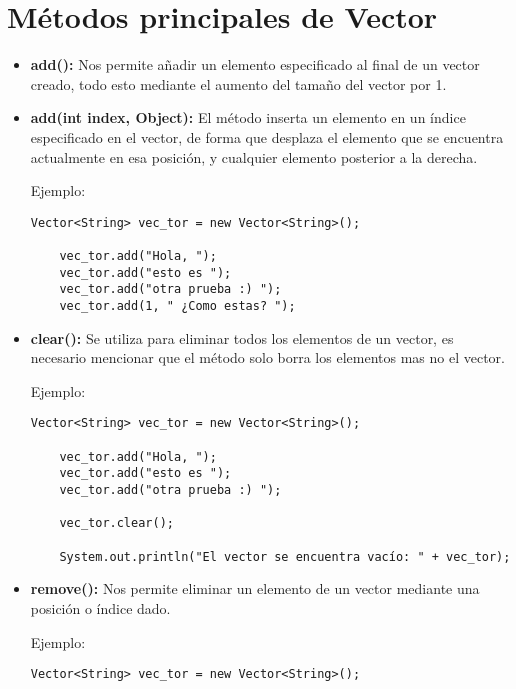 \documentclass[12pt, letterpaper]{article} %
\begin{document}
\section*{Métodos principales de Vector}
\begin{itemize}
    \item \textbf{add():} Nos permite añadir un elemento especificado al final de un vector creado, todo esto mediante el aumento del tamaño del vector por 1.

    \item \textbf{add(int index, Object):} El método inserta un elemento en un índice especificado en el vector, de forma que desplaza el elemento que se encuentra actualmente en esa posición, y cualquier elemento posterior a la derecha.

    Ejemplo:
    \lstset{language = Java, breaklines=true, basicstyle=\footnotesize}
    \begin{lstlisting}[frame=single]
    Vector<String> vec_tor = new Vector<String>();

    vec_tor.add("Hola, ");
    vec_tor.add("esto es ");
    vec_tor.add("otra prueba :) ");
    vec_tor.add(1, " ¿Como estas? ");
    \end{lstlisting}

    \item \textbf{clear():} Se utiliza para eliminar todos los elementos de un vector, es necesario mencionar que el método solo borra los elementos mas no el vector.

    Ejemplo:
    \lstset{language = Java, breaklines=true, basicstyle=\footnotesize}
    \begin{lstlisting}[frame=single]
    Vector<String> vec_tor = new Vector<String>();

    vec_tor.add("Hola, ");
    vec_tor.add("esto es ");
    vec_tor.add("otra prueba :) ");

    vec_tor.clear();

    System.out.println("El vector se encuentra vacío: " + vec_tor);
    \end{lstlisting}

    \item \textbf{remove():} Nos permite eliminar un elemento de un vector mediante una posición o índice dado.

    Ejemplo:
    \lstset{language = Java, breaklines=true, basicstyle=\footnotesize}
    \begin{lstlisting}[frame=single]
    Vector<String> vec_tor = new Vector<String>();


\end{lstlisting}
\end{itemize}
\end{document}

